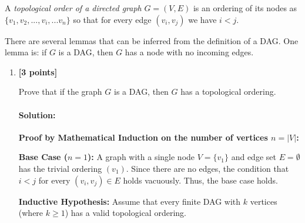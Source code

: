 \documentclass[11pt,english]{article}
\begin{document}
A \emph{topological order of a directed graph} $G=(V, E)$ is an ordering of its nodes as $\{v_1, v_2, ..., v_i, ... v_n\}$ so that for every edge $(v_i, v_j)$ we have $i < j$.

There are several lemmas that can be inferred from the definition of a DAG. One lemma is: if $G$ is a DAG, then $G$ has a node with no incoming edges.   

\begin{enumerate}[resume]

\item
\textbf{[3 points]}

Prove that if the graph $G$ is a DAG, then $G$ has a topological ordering.

\paragraph{Solution:}

\textbf{Proof by Mathematical Induction on the number of vertices $n = |V|$:}

\textbf{Base Case ($n = 1$):}
A graph with a single node $V = \{v_1\}$ and edge set $E = \emptyset$ has the trivial ordering $(v_1)$. Since there are no edges, the condition that $i < j$ for every $(v_i, v_j) \in E$ holds vacuously. Thus, the base case holds.

\textbf{Inductive Hypothesis:}
Assume that every finite DAG with $k$ vertices (where $k \ge 1$) has a valid topological ordering.


\end{enumerate}
\end{document}
